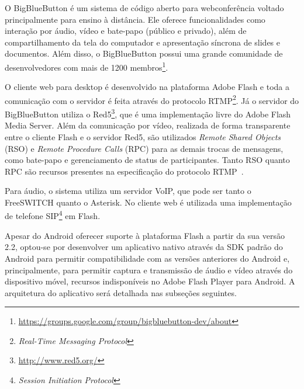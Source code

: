 \documentclass{acm_proc_article-sp}
\begin{document}

O BigBlueButton é um sistema de código aberto para webconferência voltado principalmente para ensino à distância. Ele oferece funcionalidades como interação por áudio, vídeo e bate-papo (público e privado), além de compartilhamento da tela do computador e apresentação síncrona de slides e documentos. Além disso, o BigBlueButton possui uma grande comunidade de desenvolvedores com mais de 1200 membros\footnote{\url{https://groups.google.com/group/bigbluebutton-dev/about}}.

O cliente web para desktop é desenvolvido na plataforma Adobe Flash e toda a comunicação com o servidor é feita através do protocolo RTMP\footnote{\emph{Real-Time Messaging Protocol}}. Já o servidor do BigBlueButton utiliza o Red5\footnote{\url{http://www.red5.org/}}, que é uma implementação livre do Adobe Flash Media Server. Além da comunicação por vídeo, realizada de forma transparente entre o cliente Flash e o servidor Red5, são utilizados \emph{Remote Shared Objects} (RSO) e \emph{Remote Procedure Calls} (RPC) para as demais trocas de mensagens, como bate-papo e gerenciamento de status de participantes. Tanto RSO quanto RPC são recursos presentes na especificação do protocolo RTMP~\cite{rtmp}.

Para áudio, o sistema utiliza um servidor VoIP, que pode ser tanto o FreeSWITCH quanto o Asterisk. No cliente web é utilizada uma implementação de telefone SIP\footnote{\emph{Session Initiation Protocol}} em Flash.


Apesar do Android oferecer suporte à plataforma Flash a partir da sua versão 2.2, optou-se por desenvolver um aplicativo nativo através da SDK padrão do Android para permitir compatibilidade com as versões anteriores do Android e, principalmente, para permitir captura e transmissão de áudio e vídeo através do dispositivo móvel, recursos indisponíveis no Adobe Flash Player para Android. A arquitetura do aplicativo será detalhada nas subseções seguintes.
\end{document}
